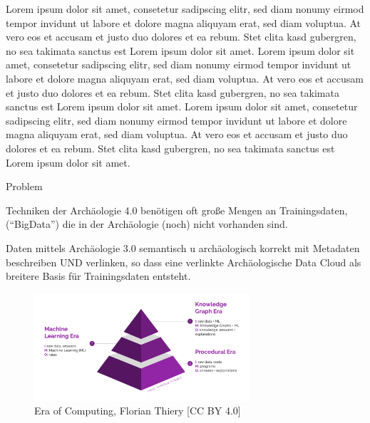 \documentclass[twocolumn]{autart}
\begin{document}
Lorem ipsum dolor sit amet, consetetur sadipscing elitr, sed diam nonumy eirmod tempor invidunt ut labore et dolore magna aliquyam erat, sed diam voluptua. At vero eos et accusam et justo duo dolores et ea rebum. Stet clita kasd gubergren, no sea takimata sanctus est Lorem ipsum dolor sit amet. Lorem ipsum dolor sit amet, consetetur sadipscing elitr, sed diam nonumy eirmod tempor invidunt ut labore et dolore magna aliquyam erat, sed diam voluptua. At vero eos et accusam et justo duo dolores et ea rebum. Stet clita kasd gubergren, no sea takimata sanctus est Lorem ipsum dolor sit amet. Lorem ipsum dolor sit amet, consetetur sadipscing elitr, sed diam nonumy eirmod tempor invidunt ut labore et dolore magna aliquyam erat, sed diam voluptua. At vero eos et accusam et justo duo dolores et ea rebum. Stet clita kasd gubergren, no sea takimata sanctus est Lorem ipsum dolor sit amet. 

Problem 

Techniken der Archäologie
4.0 benötigen oft große
Mengen an Trainingsdaten,
(“BigData”) die in der
Archäologie (noch) nicht
vorhanden sind.

Daten mittels Archäologie 3.0
semantisch u archäologisch
korrekt mit Metadaten
beschreiben UND verlinken,
so dass eine verlinkte
Archäologische Data Cloud
als breitere Basis für
Trainingsdaten entsteht.

\cite{mccreary_computing}

\cite{hey_computing}

\begin{figure}[!htb]
\begin{center}
\includegraphics[width=8cm]{Era_of_Computing.png}    %
\caption{Era of Computing, Florian Thiery [CC BY 4.0]}  %
\label{figeoc}                                 %
\end{center}                                 %
\end{figure}
\end{document}
